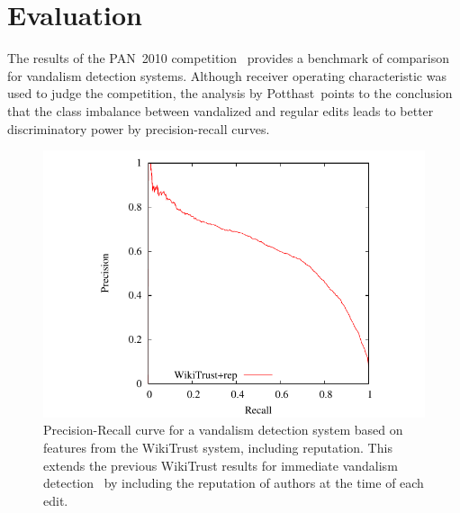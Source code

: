 \section{Evaluation}

The results of the PAN~2010 competition~\cite{Potthast2010b}
provides a benchmark of comparison for vandalism detection systems.
Although receiver operating characteristic was used to judge the
competition, the analysis by Potthast~\etal points to the conclusion
that the class imbalance between vandalized and regular edits
leads to better discriminatory power by precision-recall curves.

\begin{figure}[tbhp]
  \centering
  \includegraphics{part-Q10-vandalism/graph-wikitrust-pr}
  \caption[Precision-Recall curve for vandalism detection]{%
    Precision-Recall curve for a vandalism detection system based
    on features from the WikiTrust system, including reputation.
    This extends the previous WikiTrust results for immediate vandalism
    detection~\cite{Adler2010b} by including the reputation of authors
    at the time of each edit.}
\end{figure}

